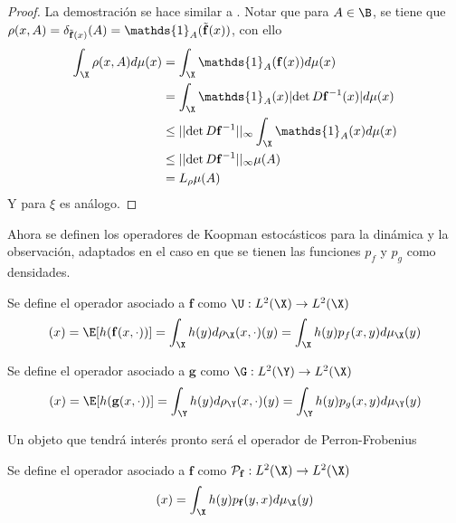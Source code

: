 \begin{proof}
    La demostración se hace similar a \cite{Kohne2024}. Notar que para $A \in \B$, se tiene que $\rho (x, A) = \delta_{\Tilde{\mathbf{f}}(x)}(A) = \mathds{1}_A (\Tilde{\mathbf{f}}(x))$, con ello
    \begin{equation*}
        \begin{aligned}
            \int_\X \rho (x, A) d\mu (x) &= \int_\X \mathds{1}_A (\mathbf{f}(x)) d \mu (x) \\
            &= \int_\X \mathds{1}_A (x) | \text{det} \, D \mathbf{f}^{-1}(x) | d \mu (x) \\
            &\leq || \text{det} \, D \mathbf{f}^{-1} ||_{\infty}  \int_\X \mathds{1}_A (x)  d\mu (x) \\
            &\leq || \text{det} \, D \mathbf{f}^{-1} ||_{\infty}  \mu (A) \\
            &= L_\rho \mu (A)
        \end{aligned}
    \end{equation*}
    Y para $\xi$ es análogo.
\end{proof}
Ahora se definen los operadores de Koopman estocásticos para la dinámica y la observación, adaptados en el caso en que se tienen las funciones $p_f$ y $p_g$ como densidades.
\begin{defn}
	Se define el operador asociado a $\mathbf{f}$ como $\U : L^2(\X) \to L^2(\X)$
	\begin{equation*}
		[\U h](x) = \E [h (\mathbf{f} (x, \cdot) )]  = \int_\X h(y) d \rho_\X (x, \cdot) (y) = \int_\X h(y) p_f (x, y) d \mu_\X (y)
	\end{equation*}
\end{defn}
\begin{defn}
	Se define el operador asociado a $\mathbf{g}$ como $\G : L^2(\Y) \to L^2(\X)$
	\begin{equation*}
		[\G h](x) = \E [h (\mathbf{g} (x, \cdot) )]  = \int_\Y h(y) d \rho_\Y (x, \cdot) (y) = \int_\Y h(y) p_g (x, y) d \mu_\Y (y)
	\end{equation*}
\end{defn}
Un objeto que tendrá interés pronto será el operador de Perron-Frobenius
\begin{defn}
	Se define el operador asociado a $\mathbf{f}$ como $\mathcal{P}_\mathbf{f} : L^2(\X) \to L^2(\X)$
	\begin{equation*}
		[\mathcal{P}_\mathbf{f} h](x) = \int_\X h(y) p_\mathbf{f} (y, x) d \mu_\X (y)
	\end{equation*}
\end{defn}
